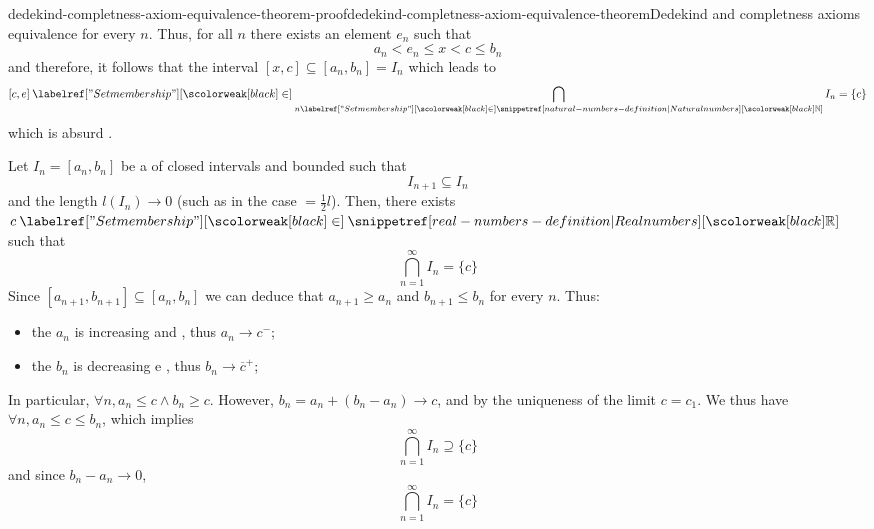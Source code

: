 \documentclass[preview]{standalone}
\begin{document}
\begin{snippetproof}{dedekind-completness-axiom-equivalence-theorem-proof}{dedekind-completness-axiom-equivalence-theorem}{Dedekind and completness axioms equivalence}
{        for every \(n\). Thus, for all \(n\) there exists an element \(e_n\) such that
        \[ a_n < e_n \leq x < c \leq b_n \]
        and therefore, it follows that the interval \([x,c] \subseteq [a_n, b_n] = I_n\)
        which leads to
        \[
            [c, e] \in \bigcap_{n\in\naturalnumbers} I_n = \{c\}
        \]
        which is absurd \lightning.
    }{
        Let \(I_n = [a_n, b_n]\) be a \sequence of closed intervals and bounded such that
        \[
            I_{n+1} \subseteq I_n
        \]
        and the length \(l(I_n)\to 0\) (such as in the case \(=\frac{1}{2}l\)).
        Then, there exists \(c\in\realnumbers\) such that
        \[
            \bigcap_{n=1}^\infty I_n = \{c\}
        \]
        Since \([a_{n+1}, b_{n+1}] \subseteq [a_n, b_n]\) we can deduce that
        \(a_{n+1} \geq a_n\) and \(b_{n+1} \leq b_n\) for every \(n\).
        Thus:
        \begin{itemize}
            \item the \sequence \(a_n\) is increasing and ,
                thus \(a_n \to c^-\);
            \item the \sequence \(b_n\) is decreasing e ,
            thus \(b_n \to {\overline{c}}^+\);
        \end{itemize}
        In particular, \(\forall n, a_n \leq c \land b_n \geq c\).
        However, \(b_n = a_n + (b_n - a_n) \to c\), and by the uniqueness of the limit
        \(c = c_1\).
        We thus have \(\forall n, a_n \leq c \leq b_n\), which implies
        \[
            \bigcap_{n=1}^\infty I_n \supseteq \{c\}
        \]
        and since \(b_n - a_n \to 0\),
        \[
            \bigcap_{n=1}^\infty I_n = \{c\}
        \]
    }
\end{snippetproof}
\end{document}
